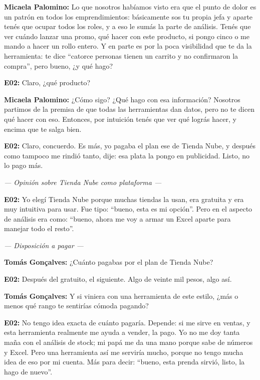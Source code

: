 \noindent\textbf{Micaela Palomino:} Lo que nosotros habíamos visto era que el punto de dolor es un patrón en todos los emprendimientos: básicamente sos tu propia jefa y aparte tenés que ocupar todos los roles, y a eso le sumás la parte de análisis. Tenés que ver cuándo lanzar una promo, qué hacer con este producto, si pongo cinco o me mando a hacer un rollo entero. Y en parte es por la poca visibilidad que te da la herramienta: te dice ``catorce personas tienen un carrito y no confirmaron la compra'', pero bueno, ¿y qué hago?

\noindent\textbf{E02:} Claro, ¿qué producto?

\noindent\textbf{Micaela Palomino:} ¿Cómo sigo? ¿Qué hago con esa información? Nosotros partimos de la premisa de que todas las herramientas dan datos, pero no te dicen qué hacer con eso. Entonces, por intuición tenés que ver qué lográs hacer, y encima que te salga bien.

\noindent\textbf{E02:} Claro, concuerdo. Es más, yo pagaba el plan ese de Tienda Nube, y después como tampoco me rindió tanto, dije: esa plata la pongo en publicidad. Listo, no lo pago más.

\noindent\textit{--- Opinión sobre Tienda Nube como plataforma ---}

\noindent\textbf{E02:} Yo elegí Tienda Nube porque muchas tiendas la usan, era gratuita y era muy intuitiva para usar. Fue tipo: ``bueno, esta es mi opción''. Pero en el aspecto de análisis era como: ``bueno, ahora me voy a armar un Excel aparte para manejar todo el resto''.

\noindent\textit{--- Disposición a pagar ---}

\noindent\textbf{Tomás Gonçalves:} ¿Cuánto pagabas por el plan de Tienda Nube?

\noindent\textbf{E02:} Después del gratuito, el siguiente. Algo de veinte mil pesos, algo así.

\noindent\textbf{Tomás Gonçalves:} Y si viniera con una herramienta de este estilo, ¿más o menos qué rango te sentirías cómoda pagando?

\noindent\textbf{E02:} No tengo idea exacta de cuánto pagaría. Depende: si me sirve en ventas, y esta herramienta realmente me ayuda a vender, la pago. Yo no me doy tanta maña con el análisis de stock; mi papá me da una mano porque sabe de números y Excel. Pero una herramienta así me serviría mucho, porque no tengo mucha idea de eso por mi cuenta. Más para decir: ``bueno, esta prenda sirvió, listo, la hago de nuevo''.

